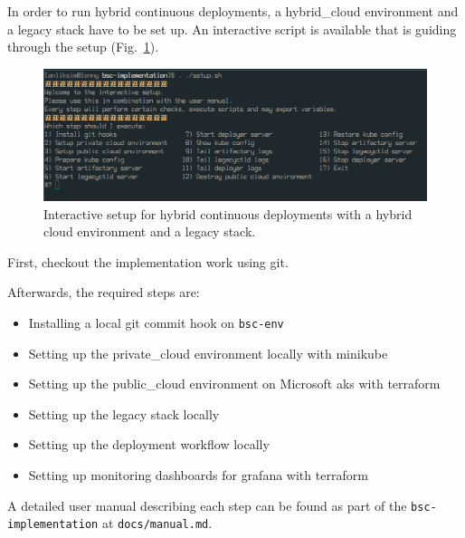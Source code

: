 \documentclass[../main.tex]{subfiles}
\begin{document}
    In order to run hybrid continuous deployments, a \gls{hybrid_cloud} environment and a legacy stack have to be set up.
    An interactive script is available that is guiding through the setup (Fig.~\ref{fig:interactive_stetup}).

    \begin{figure}[h]
        \centering
        \includegraphics[width=\linewidth]{img/interactive_setup.png}
        \captionsetup{justification=centering}
        \caption{
            Interactive setup for hybrid continuous deployments with a hybrid cloud environment and a legacy stack.
        }
        \label{fig:interactive_stetup}
    \end{figure}

    First, checkout the implementation work using \gls{git}.

    Afterwards, the required steps are:
    \begin{itemize}
        \setlength\itemsep{0em}
        \item Installing a local \gls{git} commit hook on \verb|bsc-env|
        \item Setting up the \gls{private_cloud} environment locally with \gls{minikube}
        \item Setting up the \gls{public_cloud} environment on Microsoft \acrshort{aks} with \gls{terraform}
        \item Setting up the legacy stack locally
        \item Setting up the deployment workflow locally
        \item Setting up monitoring dashboards for \gls{grafana} with \gls{terraform}
    \end{itemize}

    A detailed user manual describing each step can be found as part of the \verb|bsc-implementation| at \verb|docs/manual.md|.
\end{document}
